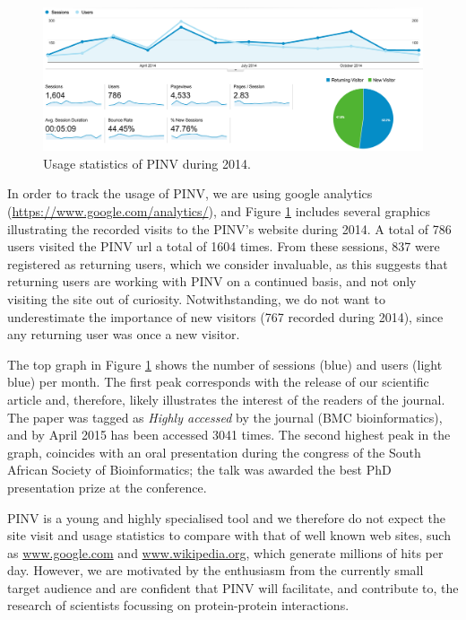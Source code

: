 \begin{figure}
\centering
\includegraphics[width=\textwidth]{figures/google_analytics.png}
\caption[Usage statistics of PINV during 2014]{Usage statistics of PINV during 2014. 
\label{fig:google_analytics}}
\end{figure}

In order to track the usage of PINV, we are using google analytics (\url{https://www.google.com/analytics/}), and Figure \ref{fig:google_analytics} includes several graphics illustrating the recorded visits to the PINV's website during 2014. A total of 786 users visited the PINV url a total of 1604 times. From these sessions, 837 were registered as returning users, which we consider invaluable, as this suggests that returning users are working with PINV on a continued basis, and not only visiting the site out of curiosity.  Notwithstanding, we do not want to underestimate the importance of new visitors (767 recorded during 2014), since any returning user was once a new visitor.

The top graph in Figure \ref{fig:google_analytics} shows the number of sessions (blue) and users (light blue) per month. The first peak corresponds with the release of our scientific article \cite{SAL2014} and, therefore, likely illustrates the interest of the readers of the journal. The paper was tagged as \emph{Highly accessed} by the journal (BMC bioinformatics), and by April 2015 has been accessed 3041 times. The second highest peak in the graph, coincides with an oral presentation during the congress of the South African Society of Bioinformatics; the talk was awarded the best PhD presentation prize at the conference.

PINV is a young and highly specialised tool and we therefore do not expect the site visit and usage statistics to compare with that of  well known web sites, such as \url{www.google.com} and \url{www.wikipedia.org}, which generate millions of hits per day. However, we are motivated by the enthusiasm from the currently small target audience and are confident that PINV will facilitate, and contribute to, the research of scientists focussing on protein-protein interactions.
